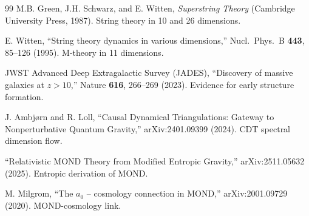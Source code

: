 \documentclass[11pt,a4paper]{article}
\theoremstyle{plain}
\theoremstyle{definition}
\theoremstyle{remark}
\begin{document}
\begin{thebibliography}{99}
 M.B. Green, J.H. Schwarz, and E. Witten, \emph{Superstring Theory} (Cambridge University Press, 1987). String theory in 10 and 26 dimensions.

 E. Witten, ``String theory dynamics in various dimensions,'' Nucl.\ Phys.\ B \textbf{443}, 85--126 (1995). M-theory in 11 dimensions.

 JWST Advanced Deep Extragalactic Survey (JADES), ``Discovery of massive galaxies at $z > 10$,'' Nature \textbf{616}, 266--269 (2023). Evidence for early structure formation.

 J. Ambj{\o}rn and R. Loll, ``Causal Dynamical Triangulations: Gateway to Nonperturbative Quantum Gravity,'' arXiv:2401.09399 (2024). CDT spectral dimension flow.

 ``Relativistic MOND Theory from Modified Entropic Gravity,'' arXiv:2511.05632 (2025). Entropic derivation of MOND.

 M. Milgrom, ``The $a_0$ -- cosmology connection in MOND,'' arXiv:2001.09729 (2020). MOND-cosmology link.

\end{thebibliography}
\end{document}
